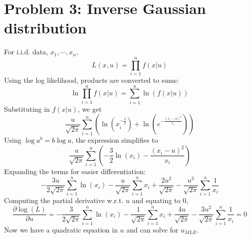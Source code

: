 \documentclass[a4paper]{article}
\begin{document}
\section{Problem 3: Inverse Gaussian distribution}
For i.i.d. data, $x_1,\cdots,x_n$,
\begin{equation}
L(x,u)=\prod_{i=1}^{n} f(x|u)
\end{equation}
Using the log likelihood, products are converted to sums:
\begin{equation}
\ln \prod_{i=1}^{n} f(x|u) = \sum_{i=1}^{n} \ln(f(x|u))
\end{equation}
Substituting in $f(x|u)$, we get
\begin{equation}
\frac{u}{\sqrt{2\pi}}\sum_{i=1}^{n} \left( \ln\left(x_i^{-\frac{3}{2}}\right) + \ln \left( e^{-\frac{(x_i-u)^2}{x_i}} \right) \right)
\end{equation}
Using $\log a^b = b\log a$, the expression simplifies to
\begin{equation}
\frac{u}{\sqrt{2\pi}}\sum_{i=1}^{n} \left( -\frac{3}{2}\ln(x_i) -\frac{(x_i-u)^2}{x_i} \right)
\end{equation}
Expanding the terms for easier differentiation:
\begin{equation}
-\frac{3u}{2\sqrt{2\pi}} \sum_{i=1}^{n} \ln(x_i) - \frac{u}{\sqrt{2\pi}} \sum_{i=1}^{n}x_i + \frac{2u^2}{\sqrt{2\pi}} - \frac{u^3}{\sqrt{2\pi}}\sum_{i=1}^{n}\frac{1}{x_i}
\end{equation}
Computing the partial derivative w.r.t. $u$ and equating to $0$,
\begin{equation}
\frac{\partial \log(L)}{\partial u} =
-\frac{3}{2\sqrt{2\pi}} \sum_{i=1}^{n} \ln(x_i) - \frac{1}{\sqrt{2\pi}} \sum_{i=1}^{n}x_i + \frac{4u}{\sqrt{2\pi}} - \frac{3u^2}{\sqrt{2\pi}}\sum_{i=1}^{n}\frac{1}{x_i} = 0
\end{equation}
Now we have a quadratic equation in $u$ and can solve for $u_{MLE}$.
\end{document}
